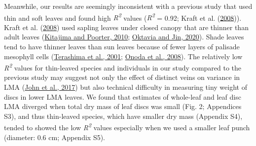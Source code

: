 \documentclass[
  12pt,
  a4paper,
,tablecaptionabove
]{scrartcl}
\begin{document}
Meanwhile, our results are seemingly inconsistent with a previous study that used thin and soft leaves and found high \emph{R\textsuperscript{2}} values (\emph{R\textsuperscript{2}} = 0.92; Kraft et al. (\protect\hyperlink{ref-Kraft2008}{2008})).
Kraft et al. (\protect\hyperlink{ref-Kraft2008}{2008}) used sapling leaves under closed canopy that are thinner than adult leaves (\protect\hyperlink{ref-Kitajima2010}{Kitajima and Poorter, 2010}; \protect\hyperlink{ref-Oktavia2020}{Oktavia and Jin, 2020}).
Shade leaves tend to have thinner leaves than sun leaves because of fewer layers of palisade mesophyll cells (\protect\hyperlink{ref-Terashima2001}{Terashima et al., 2001}; \protect\hyperlink{ref-Onoda2008}{Onoda et al., 2008}).
The relatively low \emph{R\textsuperscript{2}} values for thin-leaved species and individuals in our study compared to the previous study may suggest not only the effect of distinct veins on variance in LMA (\protect\hyperlink{ref-John2017}{John et al., 2017}) but also technical difficulty in measuring tiny weight of discs in lower LMA leaves.
We found that estimates of whole-leaf and leaf disc LMA diverged when total dry mass of leaf discs was small (Fig. 2; Appendices S3), and thus thin-leaved species, which have smaller dry mass (Appendix S4), tended to showed the low \emph{R\textsuperscript{2}} values especially when we used a smaller leaf punch (diameter: 0.6 cm; Appendix S5).
\end{document}
